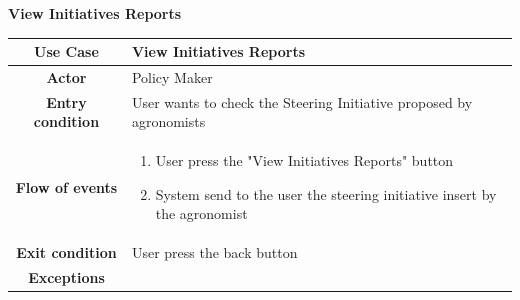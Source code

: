 \documentclass[table, 12pt]{article}
\begin{document}
\begin{itemize}
            \begin{table}[H]
                \item[] \textbf{View Initiatives Reports}
                \item[] 
                \centering
                \begin{tabular}{|c| m{}|}
                    \hline
                    \textbf{Use Case} & View Initiatives Reports\\ \hline
                    \textbf{Actor} & Policy Maker\\ \hline
                    \textbf{Entry condition} & User wants to check the Steering Initiative proposed by agronomists\\  \hline
                    \textbf{Flow of events} & \begin{enumerate}
                                                \item User press the "View Initiatives Reports" button
                                                \item System send to the user the steering initiative insert by the agronomist
                                            \end{enumerate}\\ \hline
                    \textbf{Exit condition} & User press the back button \\ \hline
                    \textbf{Exceptions} &  \\ \hline                    
                \end{tabular}
            \end{table}
                

\end{itemize}
\end{document}
